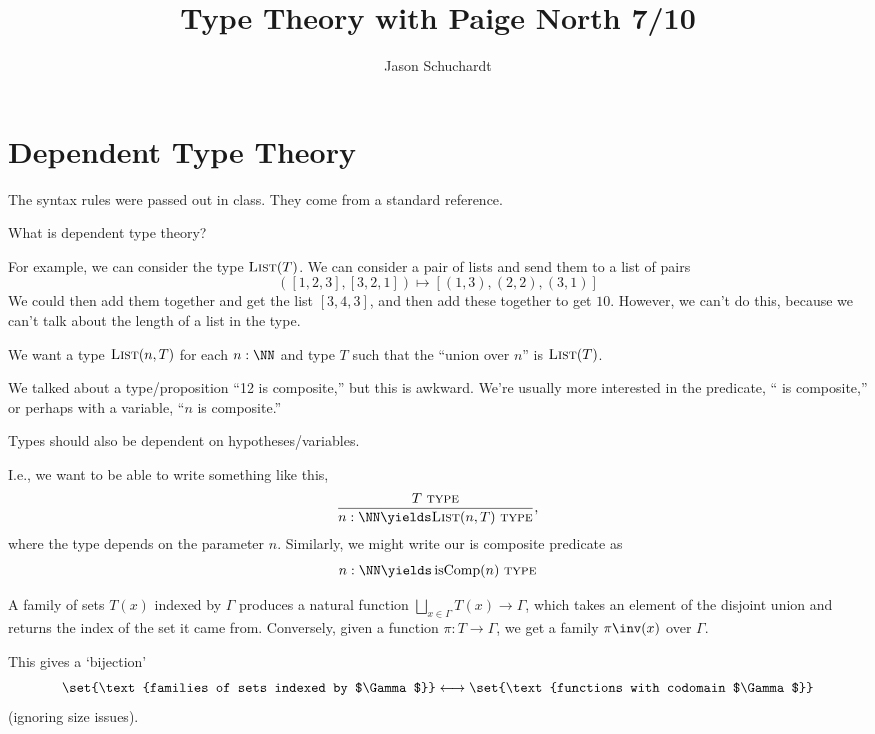 \documentclass{article}
\title{Type Theory with Paige North 7/10}
\author{Jason Schuchardt}
\newcommand\blank{ \underline{\phantom{$\quad\quad$}} }
\newcommand\TYPE{\text{ \scshape{type}}}
\newcommand\List{\textsc{List}}
\newcommand\pred[1]{\operatorname{#1}}
\begin{document}
\maketitle

\section{Dependent Type Theory}

The syntax rules were passed out in class. They come 
from a standard reference.

What is dependent type theory?

For example, we can consider the type $\List(T)$.
We can consider a pair of lists and send them 
to a list of pairs
\[ ([1,2,3],[3,2,1]) \mapsto [(1,3),(2,2),(3,1)]\]
We could then add them together and get the list 
$[3,4,3]$, and then add these together to get 
$10$. However, we can't do this, because we 
can't talk about the length of a list in the 
type.

We want a type $\List(n,T)$ for each 
$n:\NN$ and type $T$ such that the 
``union over $n$'' is $\List(T)$.

We talked about a type/proposition 
``12 is composite,''
but this is awkward. We're usually more 
interested in the predicate,
``\blank is composite,'' or 
perhaps with a variable,
``$n$ is composite.''

Types should also be dependent on 
hypotheses/variables.

\begin{example}
    I.e., we want to be able to write 
    something like this,
    \[\frac{T\TYPE}{n:\NN\yields \List(n,T)\TYPE},\]
    where the type depends on the parameter $n$.
    Similarly, we might write our is composite predicate as
    \[n:\NN\yields \pred{isComp}(n)\TYPE\]
\end{example}

\begin{note}
    A family of sets $T(x)$ indexed by $\Gamma$ produces a
    natural function $\bigsqcup_{x\in\Gamma} T(x) \to \Gamma$,
    which takes an element of the disjoint union and returns 
    the index of the set it came from.
    Conversely, given a function $\pi : T\to \Gamma$, we get a 
    family $\pi\inv(x)$ over $\Gamma$.

    This gives a `bijection'
    \[\set{\text{families of sets indexed by $\Gamma$}}
    \longleftrightarrow 
    \set{\text{functions with codomain $\Gamma$}}
    \]
    (ignoring size issues).
\end{note}
\end{document}

